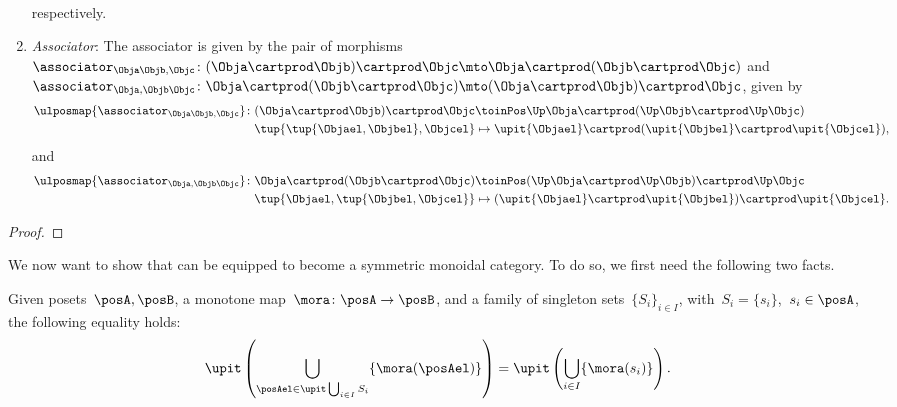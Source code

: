 \begin{lemma}
\begin{enumerate}
\begin{equation}
\begin{aligned}
            \end{aligned}
        \end{equation}
        respectively.
        \item \emph{Associator}: The associator is given by the pair of morphisms~$\associator_{\Obja\Objb,\Objc}\colon (\Obja\cartprod \Objb)\cartprod \Objc \mto \Obja\cartprod ( \Objb \cartprod \Objc)$ and~$\associator_{\Obja,\Objb\Objc}\colon \Obja\cartprod (\Objb\cartprod \Objc) \mto (\Obja\cartprod \Objb) \cartprod \Objc$, given by
        \begin{equation}
            \begin{aligned}
                \ulposmap{\associator_{\Obja\Objb,\Objc}}\colon (\Obja\cartprod \Objb)\cartprod \Objc &\toinPos \Up \Obja\cartprod (\Up \Objb \cartprod \Up \Objc)\\
                \tup{\tup{\Objael,\Objbel},\Objcel}&\mapsto \upit\{\Objael\}\cartprod (\upit\{\Objbel\}\cartprod \upit\{\Objcel\}),
            \end{aligned}
        \end{equation}
        and
        \begin{equation}
            \begin{aligned}
                \ulposmap{\associator_{\Obja,\Objb\Objc}}\colon \Obja\cartprod (\Objb\cartprod \Objc) &\toinPos (\Up \Obja\cartprod \Up \Objb) \cartprod \Up \Objc\\
                \tup{\Objael,\tup{\Objbel,\Objcel}}&\mapsto (\upit\{\Objael\}\cartprod \upit\{\Objbel\})\cartprod \upit\{\Objcel\}.
            \end{aligned}
        \end{equation}
    \end{enumerate}
\end{lemma}
\begin{proof}
\end{proof}


We now want to show that \UPos can be equipped to become a symmetric monoidal category.
To do so, we first need the following two facts.

\begin{lemma}
    \label{lem:unpack_u_functor}
    Given posets~$\posA,\posB$, a monotone map~$\mora \colon \posA \to \posB$, and a family of singleton sets~$\{S_i\}_{i\in I}$, with~$S_i=\{s_i\}$,~$s_i\in \posA$, the following equality holds:
    \begin{equation}
        \label{eq:lemma_unpack}
        \upit \left( \bigcup_{\posAel \in \upit \bigcup_{i\in I}S_i}\{\mora(\posAel)\}\right)= \upit \left( \bigcup_{i\in I} \{\mora(s_i)\}\right).
    \end{equation}
\end{lemma}

